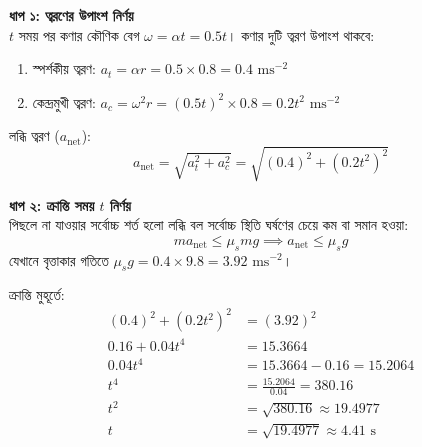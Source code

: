 \documentclass[12pt, a4paper]{article}
\begin{document}
\begin{tcolorbox}[solutionbox={সমাধান (Solution)}]
    \noindent
    \textbf{ধাপ ১: ত্বরণের উপাংশ নির্ণয়} \\
    $t$ সময় পর কণার কৌণিক বেগ $\omega = \alpha t = 0.5 t$। কণার দুটি ত্বরণ উপাংশ থাকবে:
    \begin{enumerate}[topsep=0pt, itemsep=2pt]
        \item স্পর্শকীয় ত্বরণ: $a_t = \alpha r = 0.5 \times 0.8 = 0.4\text{ ms}^{-2}$
        \item কেন্দ্রমুখী ত্বরণ: $a_c = \omega^2 r = (0.5 t)^2 \times 0.8 = 0.2 t^2\text{ ms}^{-2}$
    \end{enumerate}
    লব্ধি ত্বরণ ($a_{\text{net}}$):
    \[ a_{\text{net}} = \sqrt{a_t^2 + a_c^2} = \sqrt{(0.4)^2 + (0.2 t^2)^2} \]
    
    \vspace{0.5em}
    \noindent\textbf{ধাপ ২: ক্রান্তি সময় $t$ নির্ণয়} \\
    পিছলে না যাওয়ার সর্বোচ্চ শর্ত হলো লব্ধি বল সর্বোচ্চ স্থিতি ঘর্ষণের চেয়ে কম বা সমান হওয়া:
    \[ m a_{\text{net}} \le \mu_s m g \implies a_{\text{net}} \le \mu_s g \]
    যেখানে বৃত্তাকার গতিতে $\mu_s g = 0.4 \times 9.8 = 3.92\text{ ms}^{-2}$।
    
    ক্রান্তি মুহূর্তে:
    \begin{align*}
        (0.4)^2 + (0.2 t^2)^2 &= (3.92)^2 \\
        0.16 + 0.04 t^4 &= 15.3664 \\
        0.04 t^4 &= 15.3664 - 0.16 = 15.2064 \\
        t^4 &= \frac{15.2064}{0.04} = 380.16 \\
        t^2 &= \sqrt{380.16} \approx 19.4977 \\
        t &= \sqrt{19.4977} \approx \mathbf{4.41}\text{ s}
    \end{align*}
\end{tcolorbox}

\newpage
\end{document}
